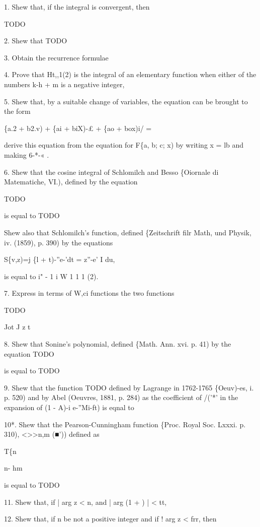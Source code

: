 1. Shew that, if the integral is convergent, then

TODO

2. Shew that TODO

3. Obtain the recurrence formulae

4. Prove that Ht,,1(2) is the integral of an elementary function when
either of the numbers k-h + m is a negative integer,

5. Shew that, by a suitable change of variables, the equation can be
brought to the form

\{a.2 + b2.v) + \{ai + biX)-£ + \{ao + box)i/ =

derive this equation from the equation for F\{a, b; c; x) by writing x
= lb and making 6-*-« .

6. Shew that the cosine integral of Schlomilch and Besso \{Oiornale di
Matematiche, VI.), defined by the equation

TODO

is equal to TODO

Shew also that Schlomilch's function, defined \{Zeitschrift filr Math,
und Physik, iv. (1859), p. 390) by the equations

S\{v,z)=j \{l + t)-''e-'dt = z''-e' I du,

is equal to i" - 1 i W  1  1  1  (2).

7. Express in terms of W,ci functions the two functions

TODO

Jot J z t

8. Shew that Sonine's polynomial, defined \{Math. Ann. xvi. p. 41) by
the equation TODO

is equal to TODO

%
%

9. Shew that the function TODO defined by Lagrange in 1762-1765
\{Oeuv)-es, i. p. 520) and by Abel (Oeuvres, 1881, p. 284) as the
coefficient of /('*' in the expansion of (1 - A)-i e-''Mi-ft) is eqnal
to

10*. Shew that the Pearson-Cunningham function \{Proc. Royal Soc.
Lxxxi. p. 310), <>>n,m (■')) defined as

T\{n

n- hm

is equal to  TODO

11. Shew that, if | arg z < n, and | arg (1 + ) | < tt,


12. Shew that, if n be not a positive integer and if ! arg z < frr,
then

